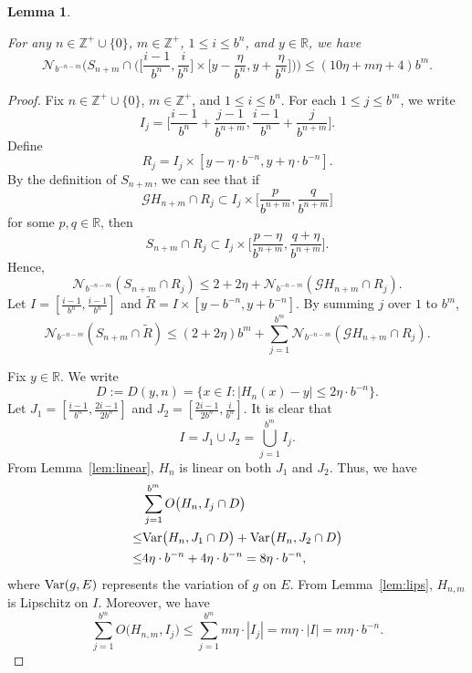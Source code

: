 \documentclass{amsart}
\newtheorem{lem}[thm]{Lemma}
\theoremstyle{definition}
\theoremstyle{remark}
\numberwithin{equation}{section}
\newcommand{\Z}{{\mathbb Z}}
\def\N{\mathcal{N}}
\def\R{\mathbb{R}}
\def\g{\mathcal{G}}
\def\wdt{\widetilde}
\newcommand{\Var}{{\rm Var}}
\begin{document}
  \begin{lem}\label{lem:tkey-new}


For any $n \in \mathbb{Z}^+\cup \{0 \}$, $m \in \Z^+$, $1 \leq i \leq b^n$, and $y \in \R$, we have
$$
	\N_{b^{-n-m}} \bigg(S_{n+m} \cap \Big(\Big[\frac{i-1}{b^n}, \frac{i}{b^n}\Big] \times \Big[y-\frac{\eta}{b^{n}},y+\frac{\eta}{b^{n}}\Big] \Big) \bigg)  \leq  (10\eta +m \eta +4  )  b^m.
$$
\end{lem}
\begin{proof}

Fix $n \in \mathbb{Z}^+\cup \{0 \}$, $m \in \Z^+$, and $1 \leq i \leq b^n$.
For each $1 \leq j\leq b^m$, we write 
$$
	I_{j}=\Big[\frac{i-1}{b^n}+\frac{j-1}{b^{n+m}}    ,\frac{i-1}{b^n}+\frac{j}{b^{n+m}}   \Big].
$$
Define
$$
 	R_j=I_{j} \times [y  -  \eta  \cdot  b^{-n},y+ \eta  \cdot  b^{-n}].
$$
By the definition of $S_{n+m}$, we can see that if 
$$
  \g H_{n+m}\cap R_j \subset I_{j}\times \Big[ \frac{p}{b^{n+m}}, \frac{q}{b^{n+m}}\Big]
$$
for some $p,q\in \R$, then 
$$
  S_{n+m}\cap R_j \subset I_{j}    \times \Big[ \frac{p-\eta}{b^{n+m}}, \frac{q+\eta}{b^{n+m}}\Big].
$$
Hence,  
$$
	\N_{b^{-n-m}}(S_{n+m}\cap R_j) \leq 2+2\eta+ \N_{b^{-n-m}}(\g H_{n+m} \cap R_j).
$$
Let $I=[\frac{i-1}{b^n}    ,\frac{i-1}{b^n}] $ and $\wdt{R}=I \times [y-b^{-n},y+b^{-n}]$.
By summing $j$ over $1$ to $b^m$,
\begin{equation}\label{eq:Lem4.7-1}
  \N_{b^{-n-m}}(S_{n+m}\cap \wdt{R}) \leq (2+2\eta)b^m+ \sum_{j=1}^{b^m} \N_{b^{-n-m}}(\g H_{n+m} \cap R_j).
\end{equation}



Fix $y \in \R$.
We write 
$$D:=D(y,n)=\big\{x\in I:  |H_{n}(x)-y| \leq 2\eta\cdot b^{-n}  \big\}.$$
Let $J_1=[\frac{i-1}{b^n}    ,\frac{2i-1}{2b^n}] $ and $J_2=[\frac{2i-1}{2b^n}    ,\frac{i}{b^n}] $. 
It is clear that 
$$I=J_1 \cup J_2 =\bigcup_{j=1}^{b^m}  I_j.    $$
From Lemma~\ref{lem:linear}, $H_{n}$ is linear on both $J_1$ and $J_2$.
Thus, we have
\begin{align}
	&\sum_{j=1}^{b^m} O\big(H_{n}, I_{j} \cap D \big) \label{eq:count-1}  \\
	\leq&\Var\big(H_{n},J_1\cap D\big)+\Var\big(H_{n}, J_2 \cap D\big)\\
	\leq & 4\eta\cdot b^{-n}+ 4\eta\cdot b^{-n} = 8\eta\cdot b^{-n},
\end{align}
where $\Var(g,E)$ represents the variation of $g$ on $E$.
From Lemma~\ref{lem:lips}, $H_{n,m}$ is Lipschitz on $I$.
Moreover, we have
\begin{equation}\label{eq:count-2}
	\sum_{j=1}^{b^m} O\big(H_{n,m}, I_{j}  \big)
	\leq \sum_{j=1}^{b^m} m  \eta   \cdot  | I_{j} |
	=m\eta  \cdot  |I|=  m \eta \cdot b^{-n}.
\end{equation}












\end{proof}
\end{document}
